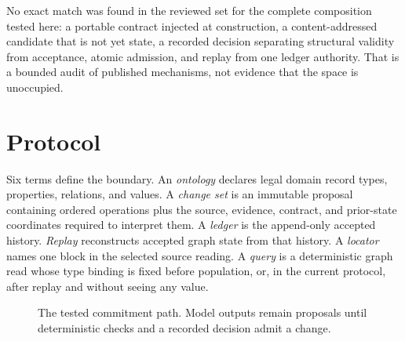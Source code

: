 \documentclass[10pt]{article}
\begin{document}
No exact match was found in the reviewed set for the complete composition tested here: a portable contract injected at construction, a content-addressed candidate that is not yet state, a recorded decision separating structural validity from acceptance, atomic admission, and replay from one ledger authority. That is a bounded audit of published mechanisms, not evidence that the space is unoccupied.

\section{Protocol}

Six terms define the boundary. An \emph{ontology} declares legal domain record types, properties, relations, and values. A \emph{change set} is an immutable proposal containing ordered operations plus the source, evidence, contract, and prior-state coordinates required to interpret them. A \emph{ledger} is the append-only accepted history. \emph{Replay} reconstructs accepted graph state from that history. A \emph{locator} names one block in the selected source reading. A \emph{query} is a deterministic graph read whose type binding is fixed before population, or, in the current protocol, after replay and without seeing any value.

\begin{figure}[h!]
\centering
{}
\caption{The tested commitment path. Model outputs remain proposals until deterministic checks and a recorded decision admit a change.}
\label{fig:protocol}
\end{figure}
\end{document}
